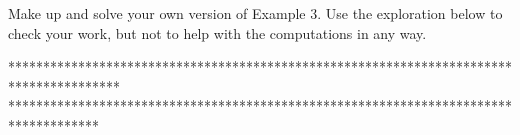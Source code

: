 \documentclass{ximera}
\begin{document}
\begin{example} \label{Ex2:Angles}
Make up and solve your own version of Example 3. Use the exploration below to check your work, but not to help with the computations in any way. 


\begin{exploration}\label{exp:angles2}

 
\begin{onlineOnly}
    \begin{center}
\end{center}
\end{onlineOnly}
\end{exploration}


\end{example}



****************************************************************************************
*************************************************************************************

\fi
\end{document}

